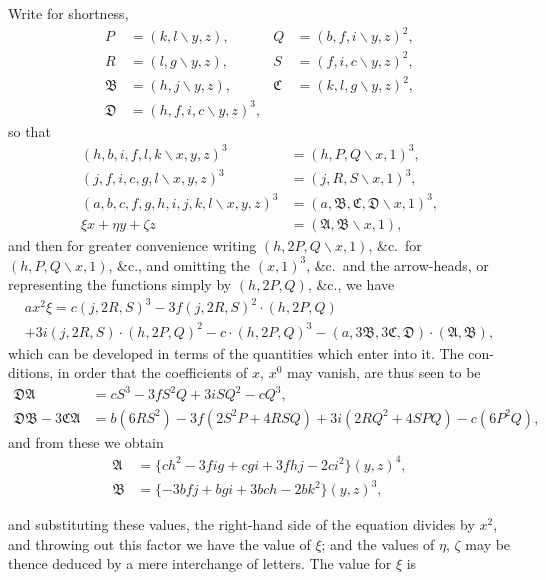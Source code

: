 \documentclass[11pt,a4paper]{book}
\begin{document}
\begin{center}
Write for shortness,
\begin{align*}
P &= (k,l\!\backslash y,z), & Q &= (b,f,i\!\backslash y,z)^2,\\
R &= (l,g\!\backslash y,z), & S &= (f,i,c\!\backslash y,z)^2,\\
\mathfrak{B} &= (h,j\!\backslash y,z), & \mathfrak{C} &= (k,l,g\!\backslash y,z)^2,\\
\mathfrak{D} &= (h,f,i,c\!\backslash y,z)^3, &&
\end{align*}
so that
\begin{align*}
(h,b,i,f,l,k\!\backslash x,y,z)^3 &= (h,P,Q\!\backslash x,1)^3,\\
(j,f,i,c,g,l\!\backslash x,y,z)^3 &= (j,R,S\!\backslash x,1)^3,\\
(a,b,c,f,g,h,i,j,k,l\!\backslash x,y,z)^3 &= (a,\mathfrak{B},\mathfrak{C},\mathfrak{D}\!\backslash x,1)^3,\\
\xi x+\eta y+\zeta z &= (\mathfrak{A},\mathfrak{B}\!\backslash x,1),
\end{align*}
and then for greater convenience writing $(h,2P,Q\!\backslash x,1)$, \&c.\ for $(h,P,Q\!\backslash x,1)$, \&c.,
and omitting the $(x,1)^3$, \&c.\ and the arrow-heads, or representing the functions simply
by $(h,2P,Q)$, \&c., we have
\begin{multline*}
a x^2 \xi = c(j,2R,S)^3 - 3f(j,2R,S)^2\cdot(h,2P,Q) \\
+ 3i(j,2R,S)\cdot(h,2P,Q)^2 - c\cdot(h,2P,Q)^3 - (a,3\mathfrak{B},3\mathfrak{C},\mathfrak{D})\cdot(\mathfrak{A},\mathfrak{B}),
\end{multline*}
which can be developed in terms of the quantities which enter into it. The con-
ditions, in order that the coefficients of $x$, $x^0$ may vanish, are thus seen to be
\begin{align*}
\mathfrak{D}\mathfrak{A} &= cS^3 - 3fS^2Q + 3iSQ^2 - cQ^3,\\
\mathfrak{D}\mathfrak{B} - 3\mathfrak{C}\mathfrak{A} &= b(6RS^2) - 3f(2S^2P+4RSQ) + 3i(2RQ^2+4SPQ) - c(6P^2Q),
\end{align*}
and from these we obtain
\begin{align*}
\mathfrak{A} &= \{ch^2-3fig+cgi+3fhj-2ci^2\}(y,z)^4,\\
\mathfrak{B} &= \{-3bfj+bgi+3bch-2bk^2\}(y,z)^3,
\end{align*}

\newpage
\noindent and substituting these values, the right-hand side of the equation divides by $x^2$, and
throwing out this factor we have the value of $\xi$; and the values of $\eta$, $\zeta$ may be
thence deduced by a mere interchange of letters. The value for $\xi$ is


\end{center}
\end{document}
